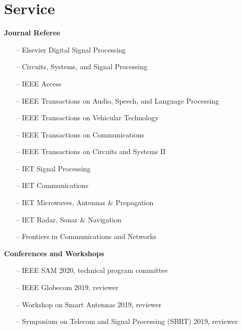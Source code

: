 \section{Service} 

{\bf Journal Referee}\\
\begin{itemize}
	\item[--] Elsevier Digital Signal Processing
	\item[--] Circuits, Systems, and Signal Processing
	\item[--] IEEE Access
	\item[--] IEEE Transactions on Audio, Speech, and Language Processing
	\item[--] IEEE Transactions on Vehicular Technology
	\item[--] IEEE Transactions on Communications
	\item[--] IEEE Transactions on Circuits and Systems II
	\item[--] IET Signal Processing
	\item[--] IET Communications
	\item[--] IET Microwaves, Antennas \& Propagation
	\item[--] IET Radar, Sonar \& Navigation
	\item[--] Frontiers in Communications and Networks 
\end{itemize}

\newpage
{\bf Conferences and Workshops}\\
\begin{itemize}
	\item[--] IEEE SAM 2020, technical program committee
	\item[--] IEEE Globecom 2019, reviewer
	\item[--] Workshop on Smart Antennas 2019, reviewer
	\item[--] Symposium on Telecom and Signal Processing (SBRT) 2019, reviewer
\end{itemize}